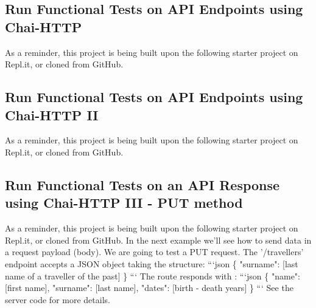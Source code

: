\documentclass{article}%
\begin{document}
%
\subsection{Run Functional Tests on API Endpoints using Chai{-}HTTP}%
\label{subsec:RunFunctionalTestsonAPIEndpointsusingChai{-}HTTP}%
As a reminder, this project is being built upon the following starter project on Repl.it, or cloned from GitHub.\newline%

%
\subsection{Run Functional Tests on API Endpoints using Chai{-}HTTP II}%
\label{subsec:RunFunctionalTestsonAPIEndpointsusingChai{-}HTTPII}%
As a reminder, this project is being built upon the following starter project on Repl.it, or cloned from GitHub.\newline%

%
\subsection{Run Functional Tests on an API Response using Chai{-}HTTP III {-} PUT method}%
\label{subsec:RunFunctionalTestsonanAPIResponseusingChai{-}HTTPIII{-}PUTmethod}%
As a reminder, this project is being built upon the following starter project on Repl.it, or cloned from GitHub.\newline%
In the next example we'll see how to send data in a request payload (body).\newline%
We are going to test a PUT request. The '/travellers' endpoint accepts a JSON object taking the structure:\newline%
```json\newline%
\{\newline%
  "surname": {[}last name of a traveller of the past{]}\newline%
\}\newline%
```\newline%
The route responds with :\newline%
```json\newline%
\{\newline%
  "name": {[}first name{]}, "surname": {[}last name{]}, "dates": {[}birth {-} death years{]}\newline%
\}\newline%
```\newline%
See the server code for more details.\newline%
\end{document}
